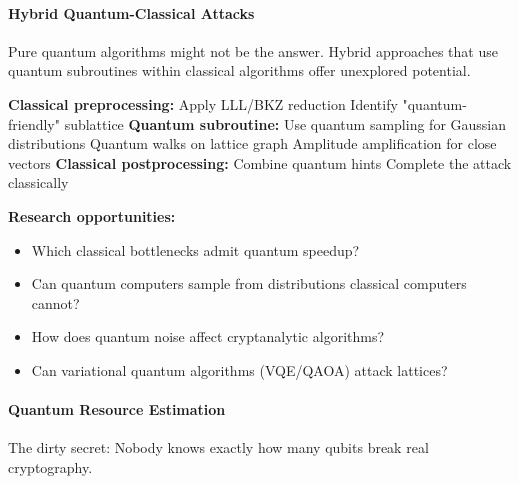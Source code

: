 \documentclass[11pt,a4paper]{article}
\begin{document}
\paragraph{Hybrid Quantum-Classical Attacks}

Pure quantum algorithms might not be the answer. Hybrid approaches that use quantum subroutines within classical algorithms offer unexplored potential.

\begin{algorithm}
\caption{Hybrid Lattice Attack Framework}
\label{alg:hybrid-attack}
\begin{algorithmic}[1]
\State \textbf{Classical preprocessing:}
\State \quad Apply LLL/BKZ reduction
\State \quad Identify "quantum-friendly" sublattice
\State \textbf{Quantum subroutine:}
\State \quad Use quantum sampling for Gaussian distributions
\State \quad Quantum walks on lattice graph
\State \quad Amplitude amplification for close vectors
\State \textbf{Classical postprocessing:}
\State \quad Combine quantum hints
\State \quad Complete the attack classically
\end{algorithmic}
\end{algorithm}

\textbf{Research opportunities:}
\begin{itemize}
    \item Which classical bottlenecks admit quantum speedup?
    \item Can quantum computers sample from distributions classical computers cannot?
    \item How does quantum noise affect cryptanalytic algorithms?
    \item Can variational quantum algorithms (VQE/QAOA) attack lattices?
\end{itemize}

\paragraph{Quantum Resource Estimation}

The dirty secret: Nobody knows exactly how many qubits break real cryptography.
\end{document}
